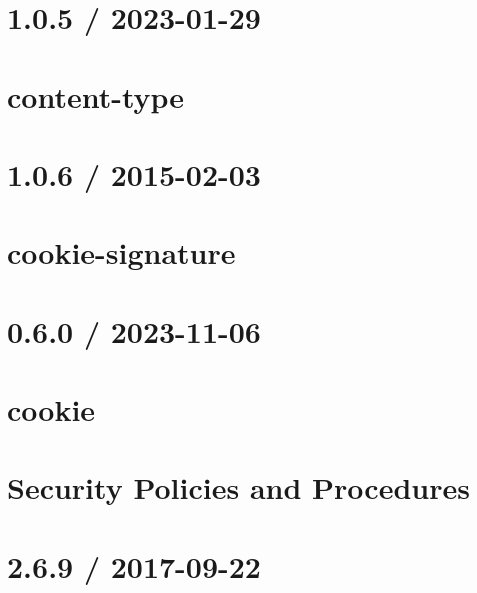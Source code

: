 \documentclass[twoside]{book}
\newcommand{\+}{\discretionary{\mbox{\scriptsize$\hookleftarrow$}}{}{}}
\begin{document}
\chapter{1.0.5 / 2023-\/01-\/29}
\label{md_Backend_nodejs_node_modules_content_type_HISTORY}

\chapter{content-\/type}
\label{md_Backend_nodejs_node_modules_content_type_README}

\chapter{1.0.6 / 2015-\/02-\/03}
\label{md_Backend_nodejs_node_modules_cookie_signature_History}

\chapter{cookie-\/signature}
\label{md_Backend_nodejs_node_modules_cookie_signature_Readme}

\chapter{0.6.0 / 2023-\/11-\/06}
\label{md_Backend_nodejs_node_modules_cookie_HISTORY}

\chapter{cookie}
\label{md_Backend_nodejs_node_modules_cookie_README}

\chapter{Security Policies and Procedures}
\label{md_Backend_nodejs_node_modules_cookie_SECURITY}

\chapter{2.6.9 / 2017-\/09-\/22}
\label{md_Backend_nodejs_node_modules_debug_CHANGELOG}

\end{document}
